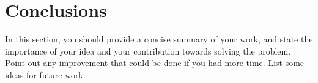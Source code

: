 \section{Conclusions}
In this section, you should provide a concise summary of your work, and state the importance of your idea and your contribution towards solving the problem. Point out any improvement that could be done if you had more time. List some ideas for future work. 
